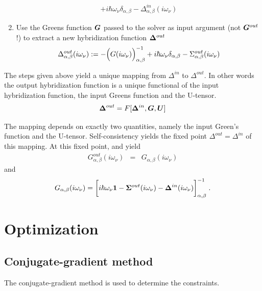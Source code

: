 \documentclass[11pt,a4paper]{report}
\begin{document}
\begin{enumerate}
\begin{eqnarray}
+i\hbar\omega_\nu\delta_{\alpha,\beta}
-\Delta^{in}_{\alpha,\beta}(i\omega_\nu)
\label{eq:sigmaout}
\end{eqnarray}
%
\item Use the Greens function $\bm{G}$ passed
  to the solver as input argument (not
  $\bm{G}^{out}$!)  to extract a new
  hybridization function $\bm{\Delta}^{out}$
\begin{eqnarray}
\Delta^{out}_{\alpha,\beta}(i\omega_\nu)
:=-\Bigl(G(i\omega_\nu)\Bigr)^{-1}_{\alpha,\beta}
+i\hbar\omega_\nu\delta_{\alpha,\beta}-\Sigma^{out}_{\alpha,\beta}(i\omega_\nu)
\label{eq:deltaout}
\end{eqnarray}
\end{enumerate}


The steps given above yield a unique mapping from $\Delta^{in}$ to
$\Delta^{out}$. In other words the output hybridization function is a
unique functional of the input hybridization function, the input
Greens function and the U-tensor.
\begin{eqnarray}
\bm{\Delta}^{out}=F[\bm{\Delta}^{in},\bm{G},\bm{U}]
\end{eqnarray}


The mapping depends on exactly two quantities, namely
the input Green's function and the U-tensor. Self-consistency yields the 
fixed point $\Delta^{out}=\Delta^{in}$ of this mapping.
At this fixed point,  and  yield
\begin{eqnarray}
G^{out}_{\alpha,\beta}(i\omega_\nu)&=&G_{\alpha,\beta}(i\omega_\nu)
\end{eqnarray}
and 
\begin{eqnarray}
G_{\alpha,\beta}(i\omega_\nu)
=\biggl[
i\hbar\omega_\nu\bm{1}
-\bm{\Sigma}^{out}(i\omega_\nu)
-\bm{\Delta}^{in}(i\omega_\nu)
\biggr]^{-1}_{\alpha,\beta}
\;.
\end{eqnarray}

\chapter{Optimization}
\section{Conjugate-gradient method}
The conjugate-gradient method is used to determine the
constraints. 
\end{document}
